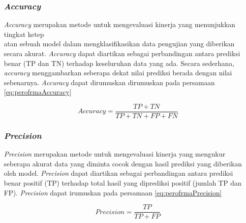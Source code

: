 \subsubsection{\textit{Accuracy}}
\textit{Accuracy} merupakan metode untuk mengevaluasi kinerja yang menunjukkan tingkat ketep\\atan sebuah model dalam mengklasifikasikan data pengujian yang diberikan secara akurat. \textit{Accuracy} dapat diartikan sebagai perbandingan antara prediksi benar (TP dan TN) terhadap keseluruhan data yang ada. Secara sederhana, \textit{accuracy} menggambarkan seberapa dekat nilai prediksi berada dengan nilai sebenarnya. \textit{Accuracy} dapat dirumuskan dirumuskan pada persamaan \ref{eq:perofrmaAccuracy} \parencite{OvalleMagallanes2020}
   
\begin{equation}
    \label{eq:perofrmaAccuracy}
    Accuracy = \frac{TP + TN}{TP + TN + FP + FN}
\end{equation}

\subsubsection{\textit{Precision}}
\textit{Precision} merupakan metode untuk mengevaluasi kinerja yang mengukur seberapa akurat data yang diminta cocok dengan hasil prediksi yang diberikan oleh model. \textit{Precision} dapat diartikan sebagai perbandingan antara prediksi benar positif (TP) terhadap total hasil yang diprediksi positif (jumlah TP dan FP). \textit{Precision} dapat irumuskan pada persamaan \ref{eq:perofrmaPrecision} \parencite{OvalleMagallanes2020}

\begin{equation}
    \label{eq:perofrmaPrecision}
    Precision = \frac{TP}{TP + FP}
\end{equation}

